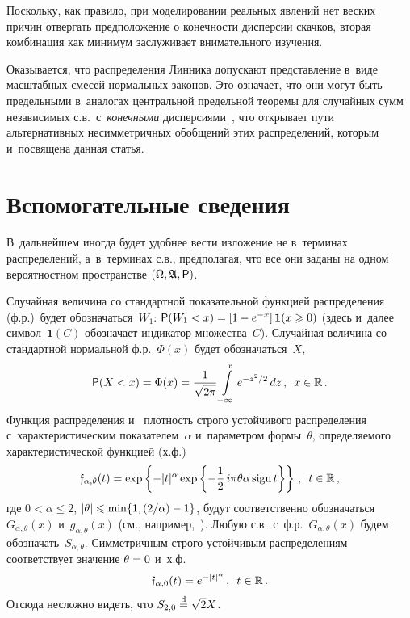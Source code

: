 \begin{multicols}{2}
Поскольку, как правило, при моделировании реальных явлений нет веских
причин отвергать предположение о конечности дисперсии скачков,
вторая комбинация как минимум заслуживает внимательного изучения.

Оказывается, что распределения Линника допускают представление 
в~виде масштабных смесей нормальных законов. Это означает, что они
могут быть предельными в~аналогах центральной предельной теоремы для
случайных сумм независимых с.в.\ с~\textit{конечными} 
дисперсиями~\cite{KorolevZeifman2016a, KorolevZeifman2016b}, что открывает пути
альтернативных несимметричных обобщений этих распределений, которым
и~посвящена данная статья.

\section{Вспомогательные сведения}

В~дальнейшем иногда будет удобнее вести изложение не в~терминах
распределений, а~в~терминах с.в., предполагая, что все они заданы
на одном вероятностном пространстве $(\Omega,\mathfrak{A}, {\sf P})$.

Случайная величина со стандартной показательной функцией распределения (ф.р.)\
будет обозначаться~$W_1$: ${\sf P}(W_1<x)\hm=\left[1-e^{-x}\right]{\bf 1}
(x\hm\geqslant0)$ (здесь и~далее символ~$\mathbf{1}(C)$ обозначает индикатор
множества~$C$). Случайная величина со стандартной нормальной ф.р.~$\Phi(x)$
будет обозначаться~$X$,
$$
{\sf P}(X<x)=\Phi(x)=\displaystyle\frac{\displaystyle 1\mathstrut}{\displaystyle \sqrt{2\pi}\mathstrut}\int\limits_{-\infty}^{x}e^{-z^2/2}\,dz\,,\enskip
x\in\mathbb{R}\,.
$$
Функция распределения и~ плот\-ность строго устойчивого распределения 
с~характеристическим показателем~$\alpha$ и~па\-ра\-мет\-ром формы~$\theta$,
определяемого характеристической функцией (х.ф.)
$$
\mathfrak{f}_{\alpha,\theta}(t)=
\exp\left\{-|t|^{\alpha}\exp\left\{-\displaystyle\frac{\displaystyle 1\mathstrut}{\displaystyle 2\mathstrut}\,
i\pi\theta\alpha\,\mathrm{sign}\,t\right\}
\right\}\,,\enskip
t\in\mathbb{R}\,,
$$
где $0<\alpha\leqslant2$, $|\theta|\hm\leqslant\min\{1,({2}/{\alpha})-1\}$, будут
соответственно обозначаться $G_{\alpha,\theta}(x)$ 
и~$g_{\alpha,\theta}(x)$ (см., например,~\cite{Zolotarev1983}). Любую
с.в.\ с~ф.р.~$G_{\alpha,\theta}(x)$ будем обозначать~$S_{\alpha,\theta}$. 
Симметричным строго устойчивым распределениям
соответствует значение $\theta\hm=0$ и~х.ф.
\begin{equation}
\mathfrak{f}_{\alpha,0}(t)=e^{-|t|^{\alpha}}\,,\enskip t\in\mathbb{R}\,.
\label{e1-kz}
\end{equation}
Отсюда несложно видеть, что $S_{2,0}\stackrel{\mathrm{d}}{=}\sqrt{2}X$.


\end{multicols}
